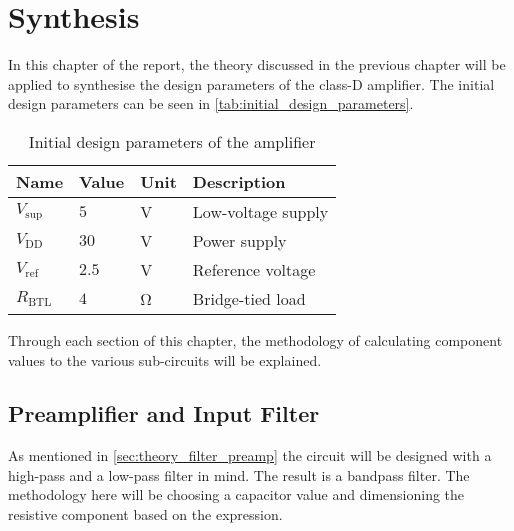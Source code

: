 \chapter[Synthesis]{Synthesis}
In this chapter of the report, the theory discussed in the previous chapter will be applied to synthesise the design parameters of the class-D amplifier. The initial design parameters can be seen in \autoref{tab:initial_design_parameters}.

\begin{table}[htbp]
	\centering
	\begin{tabular}{@{}llll@{}}
		\toprule
		\multicolumn{1}{c}{\textbf{Name}} & \textbf{Value}        & \textbf{Unit}         & \textbf{Description} \\ \midrule
		$V_{\mathrm{sup}}$ & $5$ & \si{\volt} & Low-voltage supply \\
		$V_{\mathrm{DD}}$  & $30$  & \si{\volt}   & Power supply      \\
		$V_{\mathrm{ref}}$ & $2.5$ & \si{\volt}   & Reference voltage \\
		$R_\mathrm{{BTL}}$ & $4$   & \si{\ohm} & Bridge-tied load \\ \bottomrule
	\end{tabular}
	\caption{Initial design parameters of the amplifier}
	\label{tab:initial_design_parameters}
\end{table}

Through each section of this chapter, the methodology of calculating component values to the various sub-circuits will be explained.

\section{Preamplifier and Input Filter}
As mentioned in \autoref{sec:theory_filter_preamp} the circuit will be designed with a high-pass and a low-pass filter in mind. The result is a bandpass filter. The methodology here will be choosing a capacitor value and dimensioning the resistive component based on the expression.


